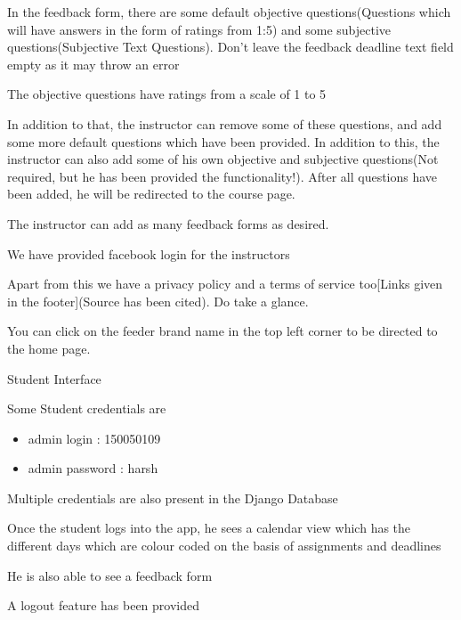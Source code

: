 \documentclass[11pt]{report}
\begin{document}
\begin{outline}
\begin{outline}
		\item In the feedback form, there are some default objective questions(Questions which will have answers in the form of ratings from 1:5) and some subjective questions(Subjective Text Questions). 
Don't leave the feedback deadline text field empty as it may throw an error
		\item The objective questions have ratings from a scale of 1 to 5
		\item In addition to that, the instructor can remove some of these questions, and add some more default questions which have been provided. In addition to this, the instructor can also add some of his own objective and subjective questions(Not required, but he has been provided the functionality!). After all questions have been added, he will be redirected to the course page.
		\item The instructor can add as many feedback forms as desired.
		\item We have provided facebook login for the instructors
		\item Apart from this we have a privacy policy and a terms of service too[Links given in the footer](Source has been cited). Do take a glance.
		\item You can click on the feeder brand name in the top left corner to be directed to the home page.
	\end{outline}
\end{outline}

\newpage
\begin{outline}
	\item Student Interface
    \begin{outline}
    	\item Some Student credentials are 
    		\begin{itemize}
    			\item admin login : 150050109
				\item admin password : harsh
    		\end{itemize}
 		Multiple credentials are also present in the Django Database
    	\item Once the student logs into the app, he sees a calendar view which has the different days which are colour coded on the basis of assignments and deadlines
    	\item He is also able to see a feedback form
    	\item A logout feature has been provided
    	
	\end{outline}
\end{outline}
\end{document}
